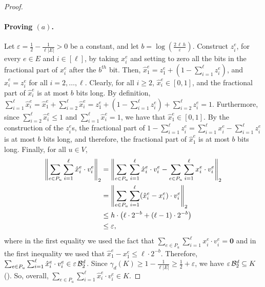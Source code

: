 \begin{proof}
\paragraph{Proving $(a)$.} 
Let $\varepsilon = \frac{1}{2}-\frac{1}{\ell |E|}  > 0$ be a constant, and let $b = \log(\frac{2 \, \ell \, h}{\varepsilon})$. Construct $z^e_i$, for every $e \in E$ and $i \in [\ell]$, by taking $x^e_i$ and setting to zero all the bits in the fractional part of $x^e_i$ after the $b^{th}$ bit. 
Then, $\hat{x}^e_1 = z^e_1 + \left( 1 - \sum_{i=1}^{\ell} z^e_i \right)$, and $\hat{x}^e_i = z^e_i$ for all $i = 2, \dots, \ell$.
Clearly, for all $i \geq 2$, $\hat{x}^e_i \in [0,1]$, and the fractional part of $\hat{x}^e_i$ is at most $b$ bits long. 
By definition, $\sum_{i=1}^\ell \hat{x}^e_i = \hat{x}^e_1 + \sum_{i=2}^{\ell} \hat{x}^e_i = z^e_1 + \left( 1 - \sum_{i=1}^{\ell} z^e_i \right) + \sum_{i=2}^{\ell} z^e_i = 1$.
Furthermore, since $\sum_{i=2}^{\ell} \hat{x}^e_i \leq 1$ and $\sum_{i=1}^\ell \hat{x}^e_i = 1$, we have that $\hat{x}^e_1 \in [0,1]$. By the construction of the $z^e_i$s, the fractional part of $1 - \sum_{i=1}^{\ell} z^e_i = \sum_{i=1}^{\ell} x^e_i - \sum_{i=1}^{\ell} z^e_i$ is at most $b$ bits long, and therefore, the fractional part of $\hat{x}^e_1$ is at most $b$ bits long. Finally, for all $u \in V$,
\begin{align*}
\left\lVert \sum_{e \in P_u} \sum_{i=1}^\ell \hat{x}^e_i \cdot v^e_i\right\rVert_2 &= \left\lVert \sum_{e \in P_u} \sum_{i=1}^\ell \hat{x}^e_i \cdot v^e_i - \sum_{e \in P_u} \sum_{i=1}^\ell x^e_i \cdot v^e_i\right\rVert_2 \\
&= \left\lVert \sum_{e \in P_u} \sum_{i=1}^\ell (\hat{x}^e_i - x^e_i) \cdot v^e_i \right\rVert_2 \\
&\leq h \cdot \left( \ell \cdot 2^{-b} + (\ell - 1) \cdot 2^{-b} \right) \\
&\leq \varepsilon,
\end{align*}
where in the first equality we used the fact that $\sum_{e \in P_u} \sum_{i=1}^\ell x^e_i \cdot v^e_i = \mathbf{0}$ and in the first inequality we used that $\hat{x}^e_1 - x^e_1 \leq \ell \cdot 2^{-b}$. Therefore, $\sum_{e \in P_u} \sum_{i=1}^\ell \hat{x}^e_i \cdot v^e_i \in \varepsilon \, \mathcal{B}^d_2$. Since $\gamma_d(K) \geq 1 - \frac{1}{\ell|E|} \geq \frac{1}{2} + \varepsilon$, we have $\varepsilon \, \mathcal{B}^d_2 \subseteq K$ (). So, overall, $\sum_{e \in P_u} \sum_{i=1}^\ell \hat{x}^e_i \cdot v^e_i \in K$.
    

\end{proof}
